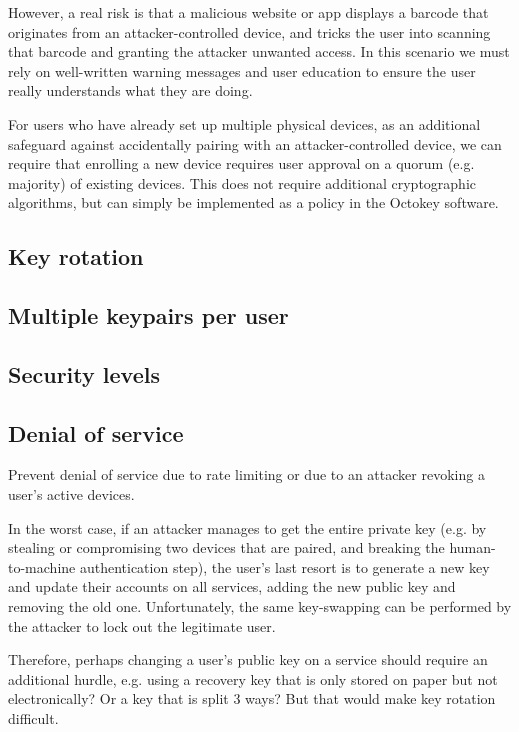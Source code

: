 However, a real risk is that a malicious website or app displays a barcode that originates from an
attacker-controlled device, and tricks the user into scanning that barcode and granting the attacker
unwanted access. In this scenario we must rely on well-written warning messages and user education
to ensure the user really understands what they are doing.

For users who have already set up multiple physical devices, as an additional safeguard against
accidentally pairing with an attacker-controlled device, we can require that enrolling a new device
requires user approval on a quorum (e.g. majority) of existing devices. This does not require
additional cryptographic algorithms, but can simply be implemented as a policy in the Octokey
software.

\subsection{Key rotation}
\subsection{Multiple keypairs per user}
\subsection{Security levels}



\subsection{Denial of service}

Prevent denial of service due to rate limiting or due to an attacker revoking a user's active
devices.

In the worst case, if an attacker manages to get the entire private key (e.g. by stealing or
compromising two devices that are paired, and breaking the human-to-machine authentication step),
the user's last resort is to generate a new key and update their accounts on all services, adding
the new public key and removing the old one. Unfortunately, the same key-swapping can be performed
by the attacker to lock out the legitimate user.

Therefore, perhaps changing a user's public key on a service should require an additional hurdle,
e.g. using a recovery key that is only stored on paper but not electronically? Or a key that is
split 3 ways? But that would make key rotation difficult.
